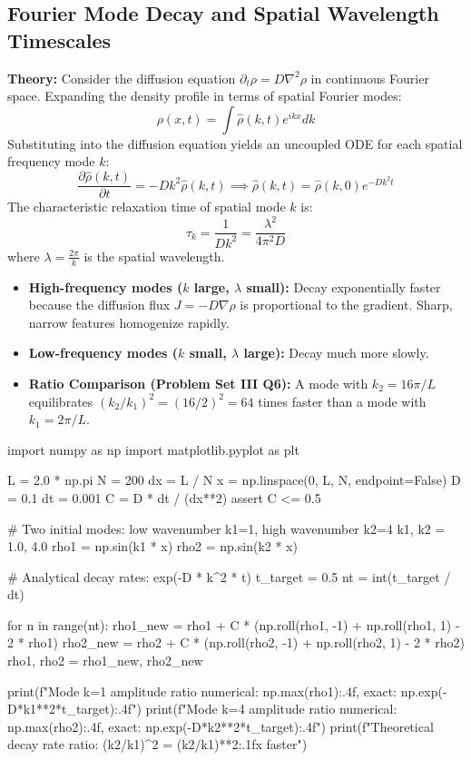 \documentclass{article}
\begin{document}
\subsection{Fourier Mode Decay and Spatial Wavelength Timescales}
\textbf{Theory:} Consider the diffusion equation $\partial_t \rho = D \nabla^2 \rho$ in continuous Fourier space. Expanding the density profile in terms of spatial Fourier modes:
$$\rho(x, t) = \int \hat{\rho}(k, t) e^{i k x} dk$$
Substituting into the diffusion equation yields an uncoupled ODE for each spatial frequency mode $k$:
$$\frac{\partial \hat{\rho}(k, t)}{\partial t} = -D k^2 \hat{\rho}(k, t) \implies \hat{\rho}(k, t) = \hat{\rho}(k, 0) e^{-D k^2 t}$$
The characteristic relaxation time of spatial mode $k$ is:
$$\tau_k = \frac{1}{D k^2} = \frac{\lambda^2}{4 \pi^2 D}$$
where $\lambda = \frac{2\pi}{k}$ is the spatial wavelength.
\begin{itemize}
    \item \textbf{High-frequency modes ($k$ large, $\lambda$ small):} Decay exponentially faster because the diffusion flux $J = -D \nabla \rho$ is proportional to the gradient. Sharp, narrow features homogenize rapidly.
    \item \textbf{Low-frequency modes ($k$ small, $\lambda$ large):} Decay much more slowly.
    \item \textbf{Ratio Comparison (Problem Set III Q6):} A mode with $k_2 = 16\pi / L$ equilibrates $(k_2 / k_1)^2 = (16/2)^2 = 64$ times faster than a mode with $k_1 = 2\pi / L$.
\end{itemize}

\begin{jupytercode}
import numpy as np
import matplotlib.pyplot as plt

L = 2.0 * np.pi
N = 200
dx = L / N
x = np.linspace(0, L, N, endpoint=False)
D = 0.1
dt = 0.001
C = D * dt / (dx**2)
assert C <= 0.5

# Two initial modes: low wavenumber k1=1, high wavenumber k2=4
k1, k2 = 1.0, 4.0
rho1 = np.sin(k1 * x)
rho2 = np.sin(k2 * x)

# Analytical decay rates: exp(-D * k^2 * t)
t_target = 0.5
nt = int(t_target / dt)

for n in range(nt):
    rho1_new = rho1 + C * (np.roll(rho1, -1) + np.roll(rho1, 1) - 2 * rho1)
    rho2_new = rho2 + C * (np.roll(rho2, -1) + np.roll(rho2, 1) - 2 * rho2)
    rho1, rho2 = rho1_new, rho2_new

print(f"Mode k=1 amplitude ratio numerical: {np.max(rho1):.4f}, exact: {np.exp(-D*k1**2*t_target):.4f}")
print(f"Mode k=4 amplitude ratio numerical: {np.max(rho2):.4f}, exact: {np.exp(-D*k2**2*t_target):.4f}")
print(f"Theoretical decay rate ratio: (k2/k1)^2 = {(k2/k1)**2:.1f}x faster")
\end{jupytercode}
\newpage
\end{document}
